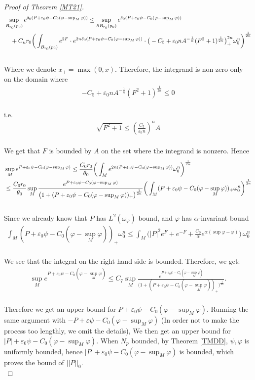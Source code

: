 \documentclass[11pt]{amsart}
\numberwithin{equation}{section}
\begin{document}
\begin{proof}[Proof of Theorem \ref{MT21}]
\begin{align}
	&\sup_{B_{r_0}(p_0)}e^{\delta_0(P+\varepsilon_0\psi-C_0(\varphi-\sup_M\varphi))} \le  \sup_{\partial B_{r_0}(p_0)}e^{\delta_0(P+\varepsilon_0\psi-C_0(\varphi-\sup_M\varphi))} \notag \\
	&\quad+C_nr_0\bigg(\int_{B_{r_0}(p_0)}e^{2F}\cdot e^{2n\delta_0(P+\varepsilon_0\psi-C_0(\varphi-\sup_M\varphi))} \cdot\big(-C_5+\varepsilon_0nA^{-\frac{1}{n}}(F^2+1)^{\frac{1}{2n}}\big)_+^{2n}\omega_0^n\bigg)^{\frac{1}{2n}}
\end{align}\\
Where we denote $x_+=\max(0,x)$. Therefore,  the integrand is non-zero only on the domain where  
\begin{align}
	-C_5+\varepsilon_0nA^{-\frac{1}{n}}(F^2+1)^{\frac{1}{2n}} \le  0
\end{align}\\
i.e. 
\begin{align}
	\sqrt{F^2+1}\le  \left( \frac{C_5}{\varepsilon_0 n}\right)^n A
\end{align}\\
We get that $F$ is bounded by $A$ on the set where the integrand is nonzero. Hence
\begin{align}
	&\sup_Me^{P+\varepsilon_0\psi-C_0(\varphi-\sup_M\varphi)} \le  \frac{C_6 r_0}{\theta_0}\bigg(\int_Me^{2n(P+\varepsilon_0\psi-C_0(\varphi-\sup_M\varphi))}\omega_0^n\bigg)^{\frac{1}{2n}} \notag \\
	&\le  \frac{C_6 r_0}{\theta_0}\sup_M\frac{e^{P+\varepsilon_0\psi-C_0(\varphi-\sup_M\varphi)}}{\big(1+(P+\varepsilon_0\psi-C_0(\varphi-\sup_M\varphi))_+\big)^{\frac{1}{2n}}}
	\bigg(\int_M(P+\varepsilon_0\psi-C_0(\varphi-\sup_M\varphi))_+\omega_0^n\bigg)^{\frac{1}{2n}}
\end{align}\\
Since we already know that $P$ has $L^2(\omega_\varphi)$ bound, and $\varphi$ has $\alpha$-invariant bound 
\begin{align}
	\int_M(P+\varepsilon_0\psi-C_0(\varphi-\sup_M\varphi))_+\omega_0^n \le  \int_M \big(|P|^2e^F + e^{-F} + \frac{C_0}{\alpha} e^{\alpha(\sup \varphi -\varphi)}\big) \, \omega_0^n
\end{align}\\
We see that the integral on the right hand side is bounded. Therefore, we get:
\begin{align}
	\sup_Me^{P+\varepsilon_0\psi-C_0(\varphi-\sup_M\varphi)} \le  C_7 \sup_M\frac{e^{P+\varepsilon_0\psi-C_0(\varphi-\sup_M\varphi)}}{\big(1+(P+\varepsilon_0\psi-C_0(\varphi-\sup_M\varphi))_+\big)^{\frac{1}{2n}}}.
\end{align}\\
Therefore we get an upper bound for $P+\varepsilon_0\psi-C_0(\varphi-\sup_M\varphi)$. Running the same argument with $-P+\varepsilon\psi-C_0(\varphi-\sup_M\varphi)$ (In order not to make the process too lengthly, we omit the details), We then get an upper bound for $|P|+\varepsilon_0\psi-C_0(\varphi-\sup_M\varphi)$. When $N_p$ bounded, by Theorem \ref{TMDD}, $\psi, \varphi$ is uniformly bounded, hence $|P|+\varepsilon_0\psi-C_0(\varphi-\sup_M\varphi)$ is bounded, which proves the bound of $||P||_0$. \\ 


\end{proof}
\end{document}
